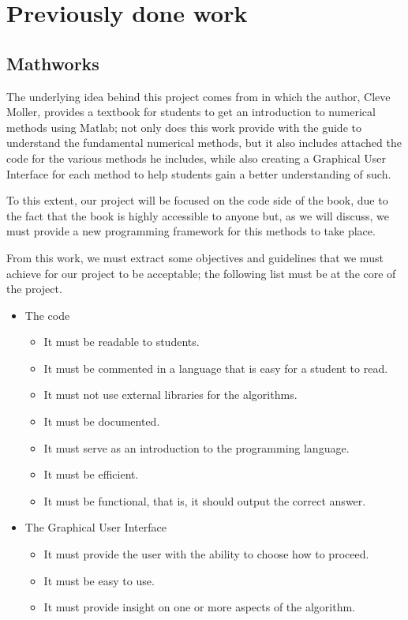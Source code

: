 \chapter{Previously done work}
\section{Mathworks}
The underlying idea behind this project comes from \cite{doi:10.1137/1.9780898717952} in which the author, Cleve Moller, provides a textbook for students to get an introduction to numerical methods using Matlab; not only does this work provide with the guide to understand the fundamental numerical methods, but it also includes attached the code for the various methods he includes, while also creating a Graphical User Interface for each method to help students gain a better understanding of such.

To this extent, our project will be focused on the code side of the book, due to the fact that the book is highly accessible to anyone but, as we will discuss, we must provide a new programming framework for this methods to take place.

From this work, we must extract some objectives and guidelines that we must achieve for our project to be acceptable; the following list must be at the core of the project.

\begin{itemize}
\item The code
    \begin{itemize}
        \item It must be readable to students.
        \item It must be commented in a language that is easy for a student to read.
        \item It must not use external libraries for the algorithms.
        \item It must be documented.
        \item It must serve as an introduction to the programming language.
        \item It must be efficient.
        \item It must be functional, that is, it should output the correct answer.
    \end{itemize}
\item The Graphical User Interface
    \begin{itemize}
        \item It must provide the user with the ability to choose how to proceed.
        \item It must be easy to use.
        \item It must provide insight on one or more aspects of the algorithm.
    \end{itemize}
\end{itemize}


